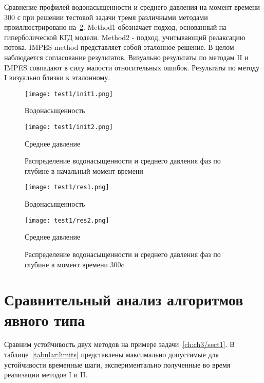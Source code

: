 Сравнение профилей водонасыщенности и среднего давления на момент времени 300 с при решении
тестовой задачи тремя различными методами проиллюстрировано на~\ref{t1_pic2}.
Method1 обозначает подход, основанный на гиперболической КГД
модели. Method2 - подход, учитывающий релаксацию потока. IMPES method представляет собой эталонное решение. В целом наблюдается согласование результатов.
Визуально результаты по методам II и IMPES совпадают в силу малости относительных ошибок. Результаты по методу I визуально близки к эталонному.

\begin{figure}
  \begin{center}
    \begin{minipage}[h]{0.49\textwidth}
       \texttt{[image: test1/init1.png]}
       \caption*{Водонасыщенность}
    \end{minipage}
    \hfill
    \begin{minipage}[h]{0.49\textwidth}
       \texttt{[image: test1/init2.png]}
       \caption*{Среднее давление}
    \end{minipage}
  \end{center}
  \caption{Распределение водонасыщенности и среднего давления фаз по глубине в начальный момент времени}
  \label{t1_pic1}
\end{figure}

\begin{figure}
  \begin{center}
    \begin{minipage}[h]{0.49\textwidth}
       \texttt{[image: test1/res1.png]}
       \caption*{Водонасыщенность}
    \end{minipage}
    \hfill
    \begin{minipage}[h]{0.49\textwidth}
       \texttt{[image: test1/res2.png]}
       \caption*{Среднее давление}
    \end{minipage}
  \end{center}
  \caption{Распределение водонасыщенности и среднего давления фаз по глубине в момент времени 300c}
  \label{t1_pic2}
\end{figure}

\section{Сравнительный анализ алгоритмов явного типа} \label{ch:ch3/sect2}

Сравним устойчивость двух методов на примере задачи~\ref{ch:ch3/sect1}.
В таблице~\ref{tabular:limits} представлены максимально допустимые для устойчивости временные шаги, экспериментально полученные во время реализации методов I и II. 

